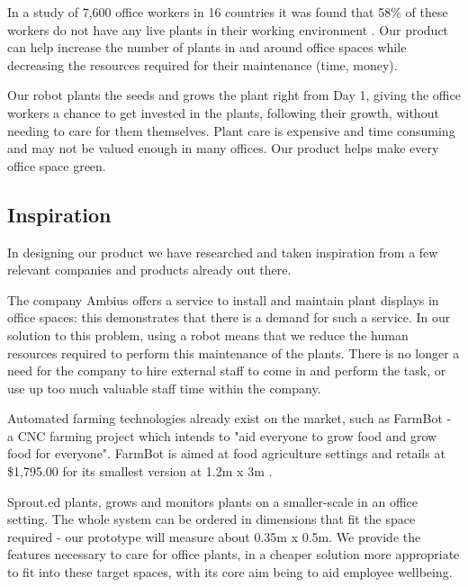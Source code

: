\documentclass{article}
\begin{document}
In a study of 7,600 office workers in 16 countries it was found that 58\% of these workers do not have any live plants in their working environment \cite{browning_2015}. Our product can help increase the number of plants in and around office spaces while decreasing the resources required for their maintenance (time, money).


Our robot plants the seeds and grows the plant right from Day 1, giving the office workers a chance to get invested in the plants, following their growth, without needing to care for them themselves. Plant care is expensive and time consuming and may not be valued enough in many offices. Our product helps make every office space green.

\subsection{Inspiration}

In designing our product we have researched and taken inspiration from a few relevant companies and products already out there.

The company Ambius \cite{ambius_uk} offers a service to install and maintain plant displays in office spaces: this demonstrates that there is a demand for such a service. In our solution to this problem, using a robot means that we reduce the human resources required to perform this maintenance of the plants. There is no longer a need for the company to hire external staff to come in and perform the task, or use up too much valuable staff time within the company.


Automated farming technologies already exist on the market, such as FarmBot - a CNC farming project which intends to "aid everyone to grow food and grow food for everyone". FarmBot is aimed at food agriculture settings and retails at \$1,795.00 for its smallest version at 1.2m x 3m \cite{farmbot_2020}.

Sprout.ed plants, grows and monitors plants on a smaller-scale in an office setting. The whole system can be ordered in dimensions that fit the space required - our prototype will measure about 0.35m x 0.5m. We provide the features necessary to care for office plants, in a cheaper solution more appropriate to fit into these target spaces, with its core aim being to aid employee wellbeing.
\end{document}
